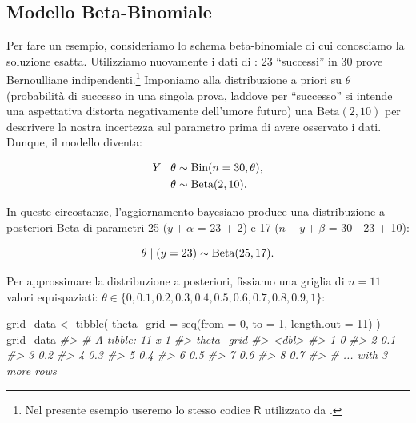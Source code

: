 \documentclass[
  11pt,
]{krantz}
\makeatletter
\newenvironment{Shaded}{\begin{snugshade}}{\end{snugshade}}
\newcommand{\AttributeTok}[1]{\textcolor[rgb]{0.61,0.61,0.61}{#1}}
\newcommand{\CommentTok}[1]{\textcolor[rgb]{0.37,0.37,0.37}{\textit{#1}}}
\newcommand{\DecValTok}[1]{\textcolor[rgb]{0.06,0.06,0.06}{#1}}
\newcommand{\FunctionTok}[1]{\textcolor[rgb]{0,0,0}{#1}}
\newcommand{\NormalTok}[1]{#1}
\newcommand{\OtherTok}[1]{\textcolor[rgb]{0.37,0.37,0.37}{#1}}
\newenvironment{kframe}{%
\medskip{}
\setlength{\fboxsep}{.8em}
 \def\at@end@of@kframe{}%
 \ifinner\ifhmode%
  \def\at@end@of@kframe{\end{minipage}}%
  \begin{minipage}{\columnwidth}%
 \fi\fi%
 \def\FrameCommand##1{\hskip\@totalleftmargin \hskip-\fboxsep
 \colorbox{shadecolor}{##1}\hskip-\fboxsep
     \hskip-\linewidth \hskip-\@totalleftmargin \hskip\columnwidth}%
 \MakeFramed {\advance\hsize-\width
   \@totalleftmargin\z@ \linewidth\hsize
   \@setminipage}}%
 {\par\unskip\endMakeFramed%
 \at@end@of@kframe}
\renewenvironment{Shaded}{\begin{kframe}}{\end{kframe}}
\newcommand{\R}{\textsf{R}} %
\theoremstyle{definition}
\theoremstyle{definition}
\theoremstyle{definition}
\theoremstyle{definition}
\theoremstyle{remark}
\makeatother
\begin{document}
\hypertarget{modello-beta-binomiale}{%
\subsection{Modello Beta-Binomiale}\label{modello-beta-binomiale}}

Per fare un esempio, consideriamo lo schema beta-binomiale di cui conosciamo la soluzione esatta. Utilizziamo nuovamente i dati di \citet{zetschefuture2019}: 23 ``successi'' in 30 prove Bernoulliane indipendenti.\footnote{Nel presente esempio useremo lo stesso codice \(\R\) utilizzato da \citet{Johnson2022bayesrules}.} Imponiamo alla distribuzione a priori su \(\theta\) (probabilità di successo in una singola prova, laddove per ``successo'' si intende una aspettativa distorta negativamente dell'umore futuro) una \(\mbox{Beta}(2, 10)\) per descrivere la nostra incertezza sul parametro prima di avere osservato i dati. Dunque, il modello diventa:

\begin{align}
Y \mid \theta & \sim \mbox{Bin}(n = 30, \theta), \notag\\
\theta & \sim \mbox{Beta}(2, 10).\notag
\end{align}

In queste circostanze, l'aggiornamento bayesiano produce una distribuzione a posteriori Beta di parametri 25 (\(y + \alpha\) = 23 + 2) e 17 (\(n - y + \beta\) = 30 - 23 + 10):

\begin{equation}
\theta \mid (y = 23) \sim \mbox{Beta}(25, 17).\notag
\end{equation}

Per approssimare la distribuzione a posteriori, fissiamo una griglia di \(n = 11\) valori equispaziati: \(\theta \in \{0, 0.1, 0.2, 0.3, 0.4, 0.5, 0.6, 0.7, 0.8, 0.9, 1\}\):

\begin{Shaded}
\begin{Highlighting}[]
\NormalTok{grid\_data }\OtherTok{\textless{}{-}} \FunctionTok{tibble}\NormalTok{(}
  \AttributeTok{theta\_grid =} \FunctionTok{seq}\NormalTok{(}\AttributeTok{from =} \DecValTok{0}\NormalTok{, }\AttributeTok{to =} \DecValTok{1}\NormalTok{, }\AttributeTok{length.out =} \DecValTok{11}\NormalTok{)}
\NormalTok{)}
\NormalTok{grid\_data}
\CommentTok{\#\textgreater{} \# A tibble: 11 x 1}
\CommentTok{\#\textgreater{}   theta\_grid}
\CommentTok{\#\textgreater{}        \textless{}dbl\textgreater{}}
\CommentTok{\#\textgreater{} 1        0  }
\CommentTok{\#\textgreater{} 2        0.1}
\CommentTok{\#\textgreater{} 3        0.2}
\CommentTok{\#\textgreater{} 4        0.3}
\CommentTok{\#\textgreater{} 5        0.4}
\CommentTok{\#\textgreater{} 6        0.5}
\CommentTok{\#\textgreater{} 7        0.6}
\CommentTok{\#\textgreater{} 8        0.7}
\CommentTok{\#\textgreater{} \# ... with 3 more rows}
\end{Highlighting}
\end{Shaded}
\end{document}
